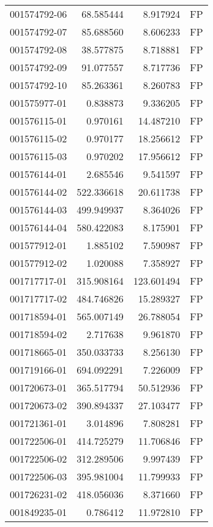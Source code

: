 \begin{tabular}{lrrl}
001574792-06 &   68.585444 &     8.917924 &   FP \\
001574792-07 &   85.688560 &     8.606233 &   FP \\
001574792-08 &   38.577875 &     8.718881 &   FP \\
001574792-09 &   91.077557 &     8.717736 &   FP \\
001574792-10 &   85.263361 &     8.260783 &   FP \\
001575977-01 &    0.838873 &     9.336205 &   FP \\
001576115-01 &    0.970161 &    14.487210 &   FP \\
001576115-02 &    0.970177 &    18.256612 &   FP \\
001576115-03 &    0.970202 &    17.956612 &   FP \\
001576144-01 &    2.685546 &     9.541597 &   FP \\
001576144-02 &  522.336618 &    20.611738 &   FP \\
001576144-03 &  499.949937 &     8.364026 &   FP \\
001576144-04 &  580.422083 &     8.175901 &   FP \\
001577912-01 &    1.885102 &     7.590987 &   FP \\
001577912-02 &    1.020088 &     7.358927 &   FP \\
001717717-01 &  315.908164 &   123.601494 &   FP \\
001717717-02 &  484.746826 &    15.289327 &   FP \\
001718594-01 &  565.007149 &    26.788054 &   FP \\
001718594-02 &    2.717638 &     9.961870 &   FP \\
001718665-01 &  350.033733 &     8.256130 &   FP \\
001719166-01 &  694.092291 &     7.226009 &   FP \\
001720673-01 &  365.517794 &    50.512936 &   FP \\
001720673-02 &  390.894337 &    27.103477 &   FP \\
001721361-01 &    3.014896 &     7.808281 &   FP \\
001722506-01 &  414.725279 &    11.706846 &   FP \\
001722506-02 &  312.289506 &     9.997439 &   FP \\
001722506-03 &  395.981004 &    11.799933 &   FP \\
001726231-02 &  418.056036 &     8.371660 &   FP \\
001849235-01 &    0.786412 &    11.972810 &   FP \\

\end{tabular}
